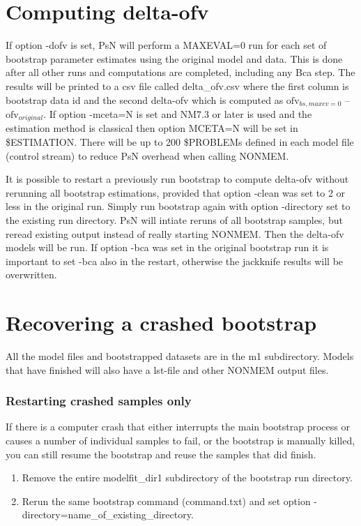 \section{Computing delta-ofv}

If option -dofv is set, PsN will perform a MAXEVAL=0 run for each set of bootstrap parameter estimates using the original model and data. This is done after all other runs and computations are completed, including any Bca step. The results will be printed to a csv file called delta\_ofv.csv where the first column is bootstrap data id and the second delta-ofv which is computed as 
$\mathrm{ofv}_{bs,maxev=0}$ – $\mathrm{ofv}_{original}$. If option -mceta=N is set and NM7.3 or later is used and the estimation method is classical then option MCETA=N will be set in \$ESTIMATION. There will be up to 200 \$PROBLEMs defined in each model file (control stream) to reduce PsN overhead when calling NONMEM.

It is possible to restart a previously run bootstrap to compute delta-ofv without rerunning all bootstrap estimations, provided that option -clean was set to 2 or less in the original run. Simply run bootstrap again with option -directory set to the existing run directory. PsN will intiate reruns of all bootstrap samples, but reread existing output instead of really starting NONMEM. Then the delta-ofv models will be run. If option -bca was set in the original bootstrap run it is important to set -bca also in the restart, otherwise the jackknife results will be overwritten. 

\section{Recovering a crashed bootstrap}

All the model files and bootstrapped datasets are in the m1 subdirectory. Models that have finished will also have a 
lst-file and other NONMEM output files.  
\subsubsection*{Restarting crashed samples only}
If there is a computer crash that either interrupts the main bootstrap process or causes a number of individual samples to fail, or the bootstrap is manually killed, you can still resume the bootstrap and reuse the samples that did finish.
\begin{enumerate}
    \item Remove the entire modelfit\_dir1 subdirectory of the bootstrap run directory.
	\item Rerun the same bootstrap command (command.txt) and set option -directory=name\_of\_existing\_directory. 
\end{enumerate}


